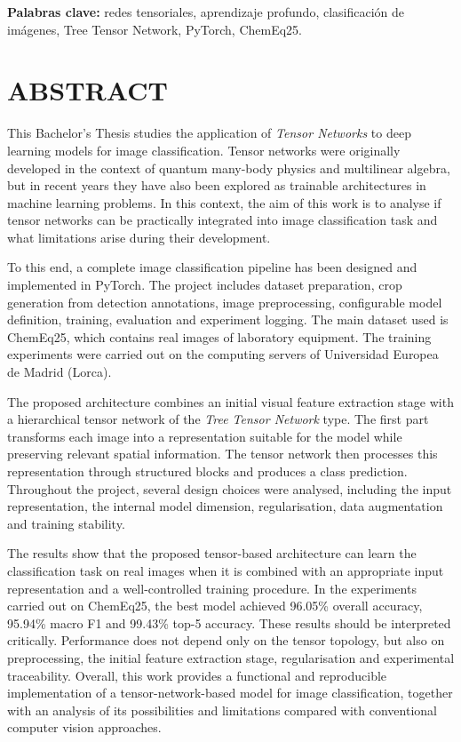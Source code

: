 \textbf{Palabras clave:} redes tensoriales, aprendizaje profundo, clasificación de imágenes, Tree Tensor Network, PyTorch, ChemEq25.

\chapter*{ABSTRACT}\label{sec:Abstract}

This Bachelor’s Thesis studies the application of \textit{Tensor Networks} to deep learning models for image classification. Tensor networks were originally developed in the context of quantum many-body physics and multilinear algebra, but in recent years they have also been explored as trainable architectures in machine learning problems. In this context, the aim of this work is to analyse if tensor networks can be practically integrated into image classification task and what limitations arise during their development.

To this end, a complete image classification pipeline has been designed and implemented in PyTorch. The project includes dataset preparation, crop generation from detection annotations, image preprocessing, configurable model definition, training, evaluation and experiment logging. The main dataset used is ChemEq25, which contains real images of laboratory equipment. The training experiments were carried out on the computing servers of Universidad Europea de Madrid (Lorca).

The proposed architecture combines an initial visual feature extraction stage with a hierarchical tensor network of the \textit{Tree Tensor Network} type. The first part transforms each image into a representation suitable for the model while preserving relevant spatial information. The tensor network then processes this representation through structured blocks and produces a class prediction. Throughout the project, several design choices were analysed, including the input representation, the internal model dimension, regularisation, data augmentation and training stability.

The results show that the proposed tensor-based architecture can learn the classification task on real images when it is combined with an appropriate input representation and a well-controlled training procedure. In the experiments carried out on ChemEq25, the best model achieved 96.05\% overall accuracy, 95.94\% macro F1 and 99.43\% top-5 accuracy. These results should be interpreted critically. Performance does not depend only on the tensor topology, but also on preprocessing, the initial feature extraction stage, regularisation and experimental traceability. Overall, this work provides a functional and reproducible implementation of a tensor-network-based model for image classification, together with an analysis of its possibilities and limitations compared with conventional computer vision approaches.

